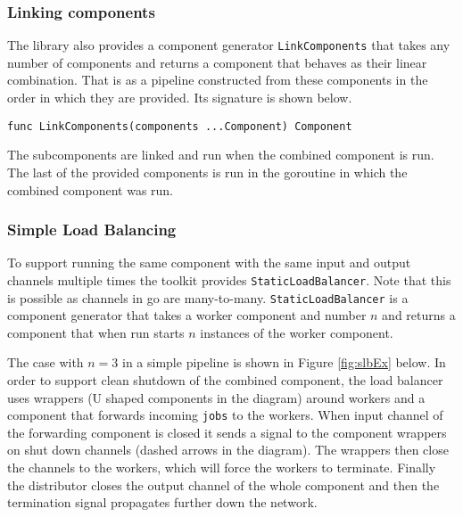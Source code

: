 \subsubsection{Linking components}
The library also provides a component generator \texttt{LinkComponents} that takes 
any number of components and returns a component that behaves as their 
linear combination. That is as a pipeline constructed from these components 
in the order in which they are provided. Its signature is shown below.
\begin{lstlisting}
func LinkComponents(components ...Component) Component
\end{lstlisting}
The subcomponents are linked and run when the combined component is run. 
The last of the provided components is run in the goroutine in which
the combined component was run.

\subsubsection{Simple Load Balancing}
To support running the same component with the same input and output 
channels multiple times the toolkit provides \texttt{StaticLoadBalancer}.
Note that this is possible as channels in go are many-to-many.
\texttt{StaticLoadBalancer} is a component generator that takes a worker 
component and number $n$ and returns a component that when run starts 
$n$ instances of the worker component. 

The case with $n=3$ in a simple pipeline is shown in Figure \ref{fig:slbEx} below. 
In order to support clean shutdown of the combined component, the load balancer uses 
wrappers (U shaped components in the diagram) around workers and a component that 
forwards incoming \texttt{jobs} to the workers. When input channel of the forwarding
component is closed it sends a signal to the component wrappers on shut 
down channels (dashed arrows in the diagram). The wrappers then close
the channels to the workers, which will force the workers to terminate.
Finally the distributor closes the output channel of the whole component
and then the termination signal propagates further down the network.

